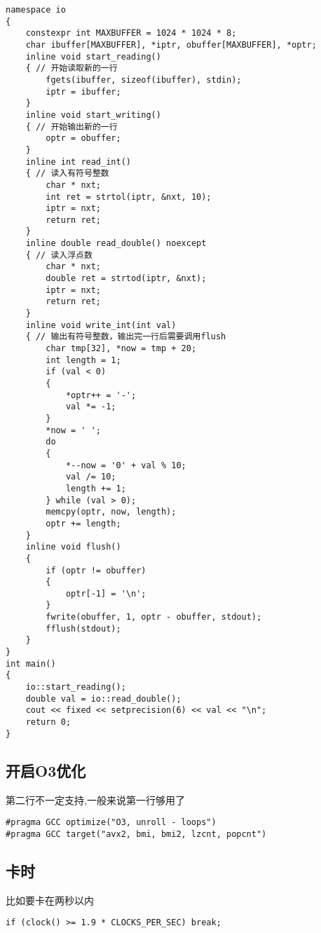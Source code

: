 \documentclass[a4paper,fontset=none]{ctexart}
\begin{document}
\begin{verbatim}
namespace io
{
    constexpr int MAXBUFFER = 1024 * 1024 * 8;
    char ibuffer[MAXBUFFER], *iptr, obuffer[MAXBUFFER], *optr;
    inline void start_reading()
    { // 开始读取新的一行
        fgets(ibuffer, sizeof(ibuffer), stdin);
        iptr = ibuffer;
    }
    inline void start_writing()
    { // 开始输出新的一行
        optr = obuffer;
    }
    inline int read_int()
    { // 读入有符号整数
        char * nxt;
        int ret = strtol(iptr, &nxt, 10);
        iptr = nxt;
        return ret;
    }
    inline double read_double() noexcept
    { // 读入浮点数
        char * nxt;
        double ret = strtod(iptr, &nxt);
        iptr = nxt;
        return ret;
    }
    inline void write_int(int val)
    { // 输出有符号整数，输出完一行后需要调用flush
        char tmp[32], *now = tmp + 20;
        int length = 1;
        if (val < 0)
        {
            *optr++ = '-';
            val *= -1;
        }
        *now = ' ';
        do
        {
            *--now = '0' + val % 10;
            val /= 10;
            length += 1;
        } while (val > 0);
        memcpy(optr, now, length);
        optr += length;
    }
    inline void flush()
    {
        if (optr != obuffer)
        {
            optr[-1] = '\n';
        }
        fwrite(obuffer, 1, optr - obuffer, stdout);
        fflush(stdout);
    }
}
int main()
{
    io::start_reading();
    double val = io::read_double();
    cout << fixed << setprecision(6) << val << "\n";
    return 0;
}
\end{verbatim}
\subsection{开启O3优化}
第二行不一定支持,一般来说第一行够用了
\begin{verbatim}
#pragma GCC optimize("O3, unroll - loops")
#pragma GCC target("avx2, bmi, bmi2, lzcnt, popcnt")
\end{verbatim}
\subsection{卡时}
比如要卡在两秒以内

\begin{verbatim}
if (clock() >= 1.9 * CLOCKS_PER_SEC) break;
\end{verbatim}
\end{document}
